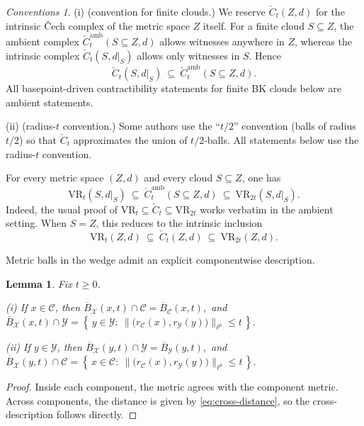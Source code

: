 \documentclass[11pt]{amsart}
\newtheorem{lemma}[theorem]{Lemma}
\theoremstyle{definition}
\theoremstyle{remark}
\newtheorem{conventions}[theorem]{Conventions}
\newcommand{\1}{\mathbbm{1}}
\newcommand{\VR}{\mathrm{VR}}
\begin{document}
\begin{conventions} (i) (convention for finite clouds.)
We reserve $\check{C}_t(Z,d)$ for the intrinsic \v{C}ech complex of the metric space $Z$ itself.
For a finite cloud $S\subseteq Z$, the ambient complex
$\check{C}^{\mathrm{amb}}_t(S\subseteq Z,d)$ allows witnesses anywhere in $Z$,
whereas the intrinsic complex $\check{C}_t(S,d|_S)$ allows only witnesses in $S$.
Hence
\[
\check{C}_t(S,d|_S)\ \subseteq\ \check{C}^{\mathrm{amb}}_t(S\subseteq Z,d).
\]
All basepoint-driven contractibility statements for finite BK clouds below are ambient statements.

(ii) (radius-$t$ convention.) Some authors use the ``$t/2$'' convention (balls of radius $t/2$) so that $\check{C}_t$
approximates the union of $t/2$-balls.
All statements below use the radius-$t$ convention.

For every metric space $(Z,d)$ and every cloud $S\subseteq Z$, one has
\[
\VR_t(S,d|_S)\ \subseteq\ \check{C}^{\mathrm{amb}}_t(S\subseteq Z,d)\ \subseteq\ \VR_{2t}(S,d|_S).
\]
Indeed, the usual proof of $\VR_t\subseteq \check{C}_t\subseteq \VR_{2t}$ works verbatim in the
ambient setting. When $S=Z$, this reduces to the intrinsic inclusion
\[
\VR_t(Z,d)\ \subseteq\ \check{C}_t(Z,d)\ \subseteq\ \VR_{2t}(Z,d).
\]
\end{conventions}
Metric balls in the wedge admit an explicit componentwise description.

\begin{lemma}
\label{prop:ball-description}
Fix $t\ge 0$.

\smallskip\noindent
\textup{(i)} If $x\in\mathcal C$, then $\overline{B}_{\mathcal X}(x,t)\cap\mathcal C
=
\overline{B}_{\mathcal C}(x,t),$
and $\overline{B}_{\mathcal X}(x,t)\cap\mathcal Y
=
\left\{\,y\in\mathcal Y:\ \bigl\|\bigl(r_{\mathcal C}(x),r_{\mathcal Y}(y)\bigr)\bigr\|_{\ell^p}\le t\,\right\}.$

\smallskip\noindent
\textup{(ii)} If $y\in\mathcal Y$, then $\overline{B}_{\mathcal X}(y,t)\cap\mathcal Y
=
\overline{B}_{\mathcal Y}(y,t),$
and
$\overline{B}_{\mathcal X}(y,t)\cap\mathcal C
=
\left\{\,x\in\mathcal C:\ \bigl\|\bigl(r_{\mathcal C}(x),r_{\mathcal Y}(y)\bigr)\bigr\|_{\ell^p}\le t\,\right\}.$
\end{lemma}

\begin{proof}
Inside each component, the metric agrees with the component metric.
Across components, the distance is given by \eqref{eq:cross-distance}, so the cross-description follows directly.
\end{proof}
\end{document}
